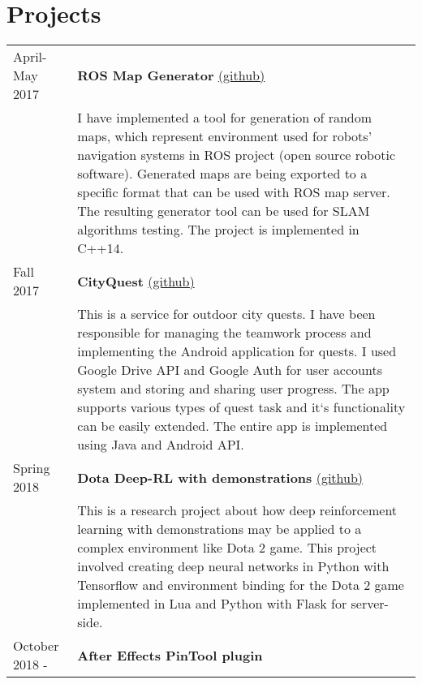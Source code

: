 \documentclass[10pt]{article}
\begin{document}
\section*{\color{accent} Projects}
\begin{tabular}{p{2.5cm}|p{14.7cm}}
  April-May 2017 \  & \textbf{ROS Map Generator} \href{https://github.com/karvozavr/ROS-Map-Generator}{\scriptsize (github)} \\
  & \footnotesize{I have implemented a tool for generation of random maps, which represent environment used for robots' navigation systems in ROS project (open source robotic software). Generated maps are being exported to a specific format that can be used with ROS map server. The resulting generator tool can be used for SLAM algorithms testing. The project is implemented in \textsc{C++14}.}  \\
  Fall 2017  & \textbf{CityQuest} \href{https://github.com/karvozavr/CityQuest/tree/dev}{\scriptsize (github)} \\
  & \footnotesize{This is a service for outdoor city quests. I have been responsible for managing the teamwork process and implementing the Android application for quests. I used Google Drive API and Google Auth for user accounts system and storing and sharing user progress. 
    The app supports various types of quest task and it`s functionality can be easily extended. The entire app is implemented using Java and Android API.}   \\
  Spring 2018 & \textbf{Dota Deep-RL with demonstrations} \href{https://github.com/karvozavr/DotA-DeepRL}{\scriptsize (github)} \\
  & \footnotesize{This is a research project about how deep reinforcement learning with demonstrations may be applied to a complex environment like Dota 2 game. This project involved creating deep neural networks in Python with Tensorflow and environment binding for the Dota 2 game implemented in Lua and Python with Flask for server-side.}   \\
    October 2018 - & \textbf{After Effects PinTool plugin} \\

\end{tabular}
\end{document}
